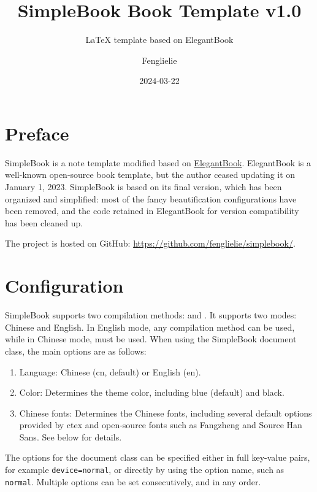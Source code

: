 \documentclass[lang=en,11pt]{../simplebook}
\title{SimpleBook Book Template v1.0}
\subtitle{\LaTeX{} template based on ElegantBook}
\author{Fenglielie}
\date{2024-03-22}
\begin{document}
\maketitle

\frontmatter

\chapter*{Preface}

SimpleBook is a note template modified based on \href{https://github.com/ElegantLaTeX/ElegantBook}{ElegantBook}. ElegantBook is a well-known open-source book template,
but the author ceased updating it on January 1, 2023.
SimpleBook is based on its final version, which has been organized and simplified: most of the fancy beautification configurations have been removed,
and the code retained in ElegantBook for version compatibility has been cleaned up.

The project is hosted on GitHub: \href{https://github.com/fenglielie/simplebook/}{https://github.com/fenglielie/simplebook/}.


\tableofcontents

\mainmatter

\chapter{Configuration}

SimpleBook supports two compilation methods:  and .
It supports two modes: Chinese and English. In English mode, any compilation method can be used, while in Chinese mode,  must be used.
When using the SimpleBook document class, the main options are as follows:

\begin{enumerate}
    \item Language: Chinese (cn, default) or English (en).
    \item Color: Determines the theme color, including blue (default) and black.
    \item Chinese fonts: Determines the Chinese fonts, including several default options provided by ctex and open-source fonts such as Fangzheng and Source Han Sans. See below for details.
\end{enumerate}


\begin{remark}
    The options for the document class can be specified either in full key-value pairs, for example \lstinline{device=normal},
    or directly by using the option name, such as \lstinline{normal}. Multiple options can be set consecutively, and in any order.
\end{remark}
\end{document}
